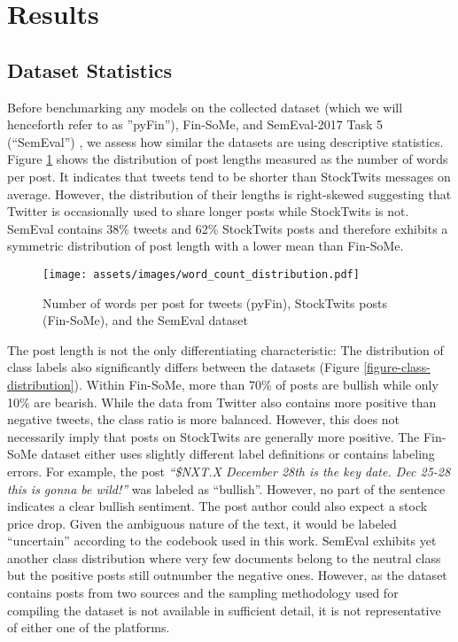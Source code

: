 \section{Results}

\subsection{Dataset Statistics}
\label{section-dataset-diffs}
Before benchmarking any models on the collected dataset (which we will henceforth refer to as ''pyFin''), Fin-SoMe, and SemEval-2017 Task 5 (``SemEval'') \cite{cortis2017semeval}, we assess how similar the datasets are using descriptive statistics. Figure \ref{figure-word-counts} shows the distribution of post lengths measured as the number of words per post. It indicates that tweets tend to be shorter than StockTwits messages on average. However, the distribution of their lengths is right-skewed suggesting that Twitter is occasionally used to share longer posts while StockTwits is not. SemEval contains 38\% tweets and 62\% StockTwits posts and therefore exhibits a symmetric distribution of post length with a lower mean than Fin-SoMe.


\begin{figure}[!ht]
	\texttt{[image: assets/images/word\_count\_distribution.pdf]}
	\caption{Number of words per post for tweets (pyFin), StockTwits posts (Fin-SoMe), and the SemEval dataset}
	\label{figure-word-counts}
\end{figure}

The post length is not the only differentiating characteristic: The distribution of class labels also significantly differs between the datasets (Figure \ref{figure-class-distribution}). Within Fin-SoMe, more than 70\% of posts are bullish while only 10\% are bearish. While the data from Twitter also contains more positive than negative tweets, the class ratio is more balanced. However, this does not necessarily imply that posts on StockTwits are generally more positive. The Fin-SoMe dataset either uses slightly different label definitions or contains labeling errors. For example, the post \emph{``\$NXT.X December 28th is the key date. Dec 25-28 this is gonna be wild!''} was labeled as ``bullish''. However, no part of the sentence indicates a clear bullish sentiment. The post author could also expect a stock price drop. Given the ambiguous nature of the text, it would be labeled ``uncertain'' according to the codebook used in this work. SemEval exhibits yet another class distribution where very few documents belong to the neutral class but the positive posts still outnumber the negative ones. However, as the dataset contains posts from two sources and the sampling methodology used for compiling the dataset is not available in sufficient detail, it is not representative of either one of the platforms.

